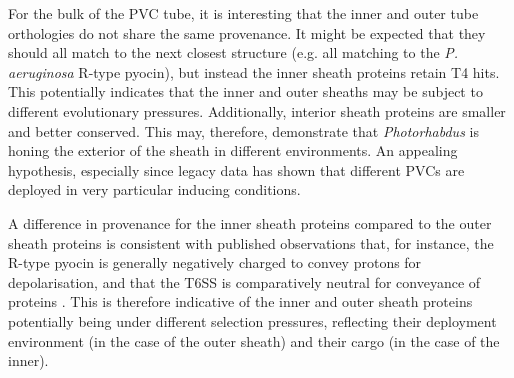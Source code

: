 For the bulk of the PVC tube, it is interesting that the inner and outer tube orthologies do not share the same provenance. It might be expected that they should all match to the next closest structure (e.g. all matching to the \emph{P. aeruginosa} R-type pyocin), but instead the inner sheath proteins retain T4 hits. This potentially indicates that the inner and outer sheaths may be subject to different evolutionary pressures. Additionally, interior sheath proteins are smaller and better conserved. This may, therefore, demonstrate that \emph{Photorhabdus} is honing the exterior of the sheath in different environments. An appealing hypothesis, especially since legacy data has shown that different PVCs are deployed in very particular inducing conditions.

A difference in provenance for the inner sheath proteins compared to the outer sheath proteins is consistent with published observations that, for instance, the R-type pyocin is generally negatively charged to convey protons for depolarisation, and that the T6SS is comparatively neutral for conveyance of proteins \citep{Ge2015}. This is therefore indicative of the inner and outer sheath proteins potentially being under different selection pressures, reflecting their deployment environment (in the case of the outer sheath) and their cargo (in the case of the inner).

